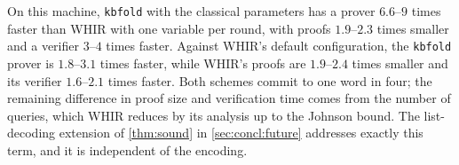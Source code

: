 On this machine, \texttt{kbfold} with the classical parameters has a prover $6.6$--$9$ times faster than WHIR with one variable per round, with proofs $1.9$--$2.3$ times smaller and a verifier $3$--$4$ times faster.
Against WHIR's default configuration, the \texttt{kbfold} prover is $1.8$--$3.1$ times faster, while WHIR's proofs are $1.9$--$2.4$ times smaller and its verifier $1.6$--$2.1$ times faster.
Both schemes commit to one word in four; the remaining difference in proof size and verification time comes from the number of queries, which WHIR reduces by its analysis up to the Johnson bound.
The list-decoding extension of \cref{thm:sound} in \cref{sec:concl:future} addresses exactly this term, and it is independent of the encoding.
